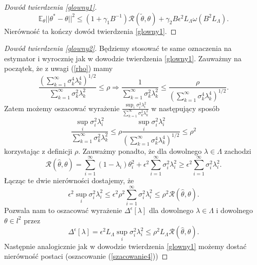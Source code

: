 \documentclass[man,mfiu]{mgrwms}
\begin{document}
\begin{proof}[Dowód twierdzenia \ref{glowny1}]
\begin{displaymath}
\mathbb{E}_{\theta}||\theta^*-\theta||^2\leq (1+\gamma_1B^{-1})\mathcal{R}(\tilde{\theta},\theta)+\gamma_2B\epsilon^2L_{\Lambda}\omega (B^2L_{\Lambda}).
\end{displaymath}
Nierówność ta kończy dowód twierdzenia \ref{glowny1}.
\end{proof}

\begin{proof}[Dowód twierdzenia \ref{glowny2}]
Będziemy stosować te same oznaczenia na estymator i wyrocznię jak w dowodzie twierdzenia \ref{glowny1}. Zauważmy na początek, że z uwagi (\ref{rho}) mamy 
\begin{displaymath}
\frac{\left(\sum_{k=1}^{\infty}\sigma_k^4\lambda_k^4\right)^{1/2}}{\sum_{k=1}^{\infty}\sigma_k^2\lambda_k^2}\leq \rho \Longrightarrow \frac{1}{\sum_{k=1}^{\infty}\sigma_k^2\lambda_k^2}\leq \frac{\rho}{\left(\sum_{k=1}^{\infty}\sigma_k^4\lambda_k^4\right)^{1/2}}.
\end{displaymath}
Zatem możemy oszacować wyrażenie $\frac{\sup_i \sigma_i^2\lambda_i^2}{\sum_{k=1}^{\infty}\sigma_k^2\lambda_k^2}$ w następujący sposób
\begin{displaymath}
\frac{\sup_i \sigma_i^2\lambda_i^2}{\sum_{k=1}^{\infty}\sigma_k^2\lambda_k^2}\leq \rho \frac{\sup_i \sigma_i^2\lambda_i^2}{\left(\sum_{k=1}^{\infty}\sigma_k^4\lambda_k^4\right)^{1/2}}\leq \rho^2
\end{displaymath}
korzystając z definicji $\rho$. Zauważmy ponadto, że dla dowolnego $\lambda\in \Lambda$ zachodzi
\begin{displaymath}
\mathcal{R}(\hat{\theta},\theta)=\sum_{i=1}^{\infty}(1-\lambda_i)\theta^2_i+\epsilon^2\sum_{i=1}^{\infty}\sigma_i^2\lambda_i^2\geq \epsilon^2\sum_{i=1}^{\infty}\sigma_i^2\lambda_i^2.
\end{displaymath}
Łącząc te dwie nierówności dostajemy, że
\begin{displaymath}
\epsilon^2\sup_i \sigma_i^2\lambda_i^2\leq \epsilon^2\rho^2\sum_{i=1}^{\infty}\sigma_i^2\lambda_i^2\leq \rho^2\mathcal{R}(\hat{\theta},\theta).
\end{displaymath}
Pozwala nam to oszacować wyrażenie $\Delta^{\epsilon}[\lambda]$ dla dowolnego $\lambda\in \Lambda$ i dowolnego $\theta\in l^2$ przez
\begin{displaymath}
\Delta^{\epsilon}[\lambda]=\epsilon^2L_{\Lambda}\sup_i \sigma_i^2\lambda_i^2\leq \rho^2L_{\Lambda}\mathcal{R}(\hat{\theta},\theta).
\end{displaymath}
Następnie analogicznie jak w dowodzie twierdzenia \ref{glowny1} możemy dostać nierówność postaci (oszacowanie (\ref{szacowanie4}))

\end{proof}
\end{document}
